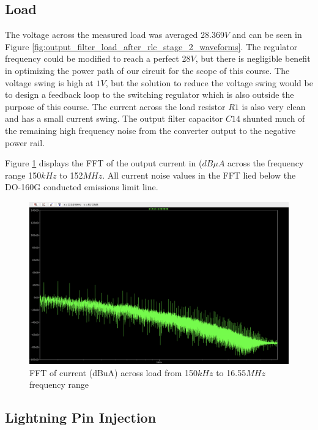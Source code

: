 \documentclass[conference]{IEEEtran}
\begin{document}
\FloatBarrier

\subsection{Load}

The voltage across the measured load was averaged 28.369$V$ and can be seen in Figure \ref{fig:output_filter_load_after_rlc_stage_2_waveforms}. The regulator frequency could be modified to reach a perfect 28$V$, but there is negligible benefit in optimizing the power path of our circuit for the scope of this course. The voltage swing is high at $1V$, but the solution to reduce the voltage swing would be to design a feedback loop to the switching regulator which is also outside the purpose of this course. The current across the load resistor $R1$ is also very clean and has a small current swing. The output filter capacitor $C14$ shunted much of the remaining high frequency noise from the converter output to the negative power rail.

Figure \ref{fig:load_fft_150kHz_16MHz_waveform} displays the FFT of the output current in ($dB \mu A$ across the frequency range 150$kHz$ to 152$MHz$. All current noise values in the FFT lied below the DO-160G conducted emissions limit line.

\begin{figure}[h]
    \centering
    \includegraphics[width=1.0\linewidth]{load_fft_150kHz_16MHz.png}
    \caption{FFT of current (dBuA) across load from 150$kHz$ to 16.55$MHz$ frequency range}
    \label{fig:load_fft_150kHz_16MHz_waveform}
\end{figure}

\FloatBarrier

\subsection{Lightning Pin Injection}
\end{document}

